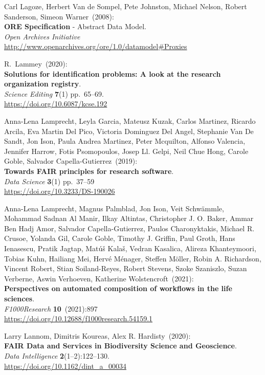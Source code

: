 \begin{thebibliography}{9}
Carl Lagoze, Herbert Van de Sompel, Pete Johnston, Michael Nelson, Robert Sanderson, Simeon Warner~(2008): \\
\textbf{ORE Specification} - {Abstract Data Model}. \\
\emph{Open Archives Initiative}\\
\url{http://www.openarchives.org/ore/1.0/datamodel#Proxies} 

R.~Lammey~(2020): \\
\textbf{Solutions for identification problems: A look at the research organization registry}.\\
\emph{Science Editing} \textbf{7}(1) pp.~65--69.\\
\url{https://doi.org/10.6087/kcse.192}

Anna-Lena Lamprecht, Leyla Garcia, Mateusz Kuzak, Carlos Martinez, Ricardo Arcila, Eva Martin Del Pico, Victoria Dominguez Del Angel, Stephanie Van De Sandt, Jon Ison, Paula Andrea Martinez, Peter Mcquilton, Alfonso Valencia, Jennifer Harrow, Fotis Psomopoulos, Josep Ll. Gelpi, Neil Chue Hong, Carole Goble, Salvador Capella-Gutierrez~(2019): \\
\textbf{Towards FAIR principles for research software}.\\
\emph{Data Science} \textbf{3}(1) pp.~37--59\\
\url{https://doi.org/10.3233/DS-190026}

Anna-Lena Lamprecht, Magnus Palmblad, Jon Ison, Veit Schwämmle, Mohammad Sadnan Al Manir, Ilkay Altintas, Christopher J. O. Baker, Ammar Ben Hadj Amor, Salvador Capella-Gutierrez, Paulos Charonyktakis, Michael R. Crusoe, Yolanda Gil, Carole Goble, Timothy J. Griffin, Paul Groth, Hans Ienasescu, Pratik Jagtap, Matúš Kalaš, Vedran Kasalica, Alireza Khanteymoori, Tobias Kuhn, Hailiang Mei, Hervé Ménager, Steffen Möller, Robin A. Richardson, Vincent Robert, Stian Soiland-Reyes, Robert Stevens, Szoke Szaniszlo, Suzan Verberne, Aswin Verhoeven, Katherine Wolstencroft~(2021): \\
\textbf{Perspectives on automated composition of workflows in the life sciences}. \\
\emph{F1000Research} \textbf{10}~(2021):897 \\
\url{https://doi.org/10.12688/f1000research.54159.1}

Larry Lannom, Dimitris Koureas, Alex R. Hardisty~(2020): \\
\textbf{FAIR Data and Services in Biodiversity Science and Geoscience}.\\
\emph{Data Intelligence} \textbf{2}(1--2):122--130.\\
\url{https://doi.org/10.1162/dint_a_00034}


\end{thebibliography}

